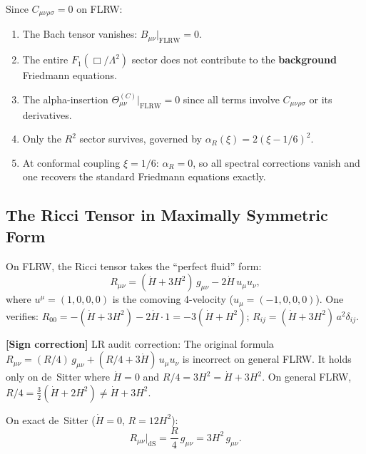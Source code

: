 \documentclass[12pt,a4paper]{article}
\theoremstyle{definition}
\theoremstyle{remark}
\newcommand{\signcorrection}[1]{%
  \par\noindent\colorbox{red!10}{%
    \parbox{\dimexpr\linewidth-2\fboxsep}{%
      \textcolor{red!50!black}{\textbf{[Sign correction]}}
      \textcolor{red!50!black}{#1}%
    }%
  }\par%
}
\begin{document}
\begin{tcolorbox}[colback=blue!5!white, colframe=blue!50!black,
  title={\textbf{Critical Consequence: Weyl Sector Drops Out of
  Background}}]
Since $C_{\mu\nu\rho\sigma} = 0$ on FLRW:
\begin{enumerate}[nosep]
  \item The Bach tensor vanishes: $B_{\mu\nu}\big|_{\mathrm{FLRW}} = 0$.
  \item The entire $F_1(\Box/\Lambda^2)$ sector does not contribute
    to the \textbf{background} Friedmann equations.
  \item The alpha-insertion $\Theta^{(C)}_{\mu\nu}\big|_{\mathrm{FLRW}} = 0$
    since all terms involve $C_{\mu\nu\rho\sigma}$ or its derivatives.
  \item Only the $R^2$ sector survives, governed by
    $\alpha_R(\xi) = 2(\xi - 1/6)^2$.
  \item At conformal coupling $\xi = 1/6$: $\alpha_R = 0$, so all
    spectral corrections vanish and one recovers the standard
    Friedmann equations exactly.
\end{enumerate}
\end{tcolorbox}

\subsection{The Ricci Tensor in Maximally Symmetric Form}

On FLRW, the Ricci tensor takes the ``perfect fluid'' form:
\begin{equation}\label{eq:Ric-pf}
  R_{\mu\nu} = (\dot{H} + 3H^2)\,g_{\mu\nu}
  - 2\dot{H}\,u_\mu u_\nu,
\end{equation}
where $u^\mu = (1, 0, 0, 0)$ is the comoving 4-velocity ($u_\mu =
(-1, 0, 0, 0)$). One verifies: $R_{00} = -(\dot{H} + 3H^2) -
2\dot{H}\cdot 1 = -3(\dot{H} + H^2)$; $R_{ij} = (\dot{H} + 3H^2)\,
a^2\delta_{ij}$.

\signcorrection{LR audit correction: The original formula
$R_{\mu\nu} = (R/4)\,g_{\mu\nu} + (R/4 + 3\dot{H})\,u_\mu u_\nu$
is incorrect on general FLRW. It holds only on de~Sitter where
$\dot{H} = 0$ and $R/4 = 3H^2 = \dot{H} + 3H^2$. On general FLRW,
$R/4 = \frac{3}{2}(\dot{H} + 2H^2) \neq \dot{H} + 3H^2$.}

On exact de~Sitter ($\dot{H} = 0$, $R = 12H^2$):
\begin{equation}\label{eq:Ric-dS}
  R_{\mu\nu}\big|_{\mathrm{dS}} = \frac{R}{4}\,g_{\mu\nu} = 3H^2\,g_{\mu\nu}.
\end{equation}
\end{document}
